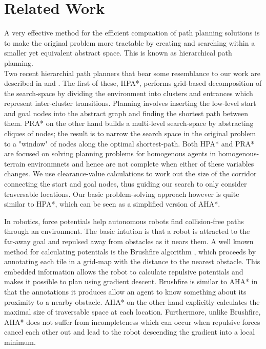 \section{Related Work}
A very effective method for the efficient compuation of path planning solutions is to make the original problem more tractable by creating and searching within a smaller yet equivalent abstract space. This is known as hierarchical path planning. \\ \newline
Two recent hierarchial path planners that bear some resemblance to our work are described in \cite{botea04} and \cite{sturtevant05}. The first of these, HPA*, performs grid-based decomposition of the search-space by dividing the environment into clusters and entrances which represent inter-cluster transitions. Planning involves inserting the low-level start and goal nodes into the abstract graph and finding the shortest path between them. 
PRA* on the other hand builds a multi-level search-space by abstracting cliques of nodes; the result is to narrow the search space in the original problem to a "window" of nodes along the optimal shortest-path.\newline
Both HPA* and PRA* are focused on solving planning problems for homogenous agents in homogenous-terrain environmnets and hence are not complete when either of these variables changes. We use clearance-value calculations to work out the size of the corridor connecting the start and goal nodes, thus guiding our search to only consider traversable locations. Our basic problem-solving approach however is quite similar to HPA*, which can be seen as a simplified version of AHA*. \\ \newline

In robotics, force potentials help autonomous robots find collision-free paths through an environment. The basic intution is that a robot is attracted to the far-away goal and repulsed away from obstacles as it nears them. A well known method for calculating potentials is the Brushfire algorithm \cite{latombe91}, which proceeds by annotating each tile in a grid-map with the distance to the nearest obstacle. This embedded information allows the robot to calculate repulsive potentials and makes it possible to plan using gradient descent. \newline
Brushfire is similar to AHA* in that the annotations it produces allow an agent to know something about its proximity to a nearby obstacle. AHA* on the other hand explicitly calculates the maximal size of traversable space at each location. Furthermore, unlike Brushfire, AHA* does not suffer from incompleteness which can occur when repulsive forces cancel each other out and lead to the robot descending the gradient into a local minimum.\\ \newline

